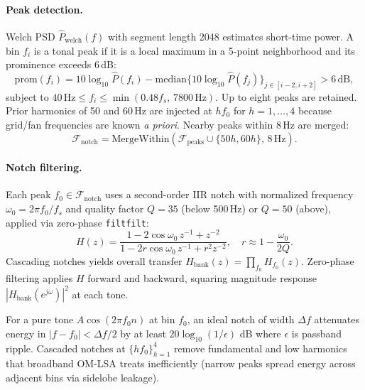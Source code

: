\paragraph{Peak detection.}
Welch PSD $\hat{P}_{\mathrm{welch}}(f)$ with segment length 2048 estimates short-time power. A bin $f_i$ is a tonal peak if it is a local maximum in a 5-point neighborhood and its prominence exceeds 6\,dB:
\begin{equation}
  \mathrm{prom}(f_i) = 10\log_{10}\hat{P}(f_i) - \mathrm{median}\bigl\{10\log_{10}\hat{P}(f_j)\bigr\}_{j\in[i-2,i+2]} > 6\,\mathrm{dB},
  \label{eq:peak_prom}
\end{equation}
subject to $40\,\mathrm{Hz} \le f_i \le \min(0.48 f_s,\, 7800\,\mathrm{Hz})$. Up to eight peaks are retained. Prior harmonics of 50 and 60\,Hz are injected at $hf_0$ for $h=1,\ldots,4$ because grid/fan frequencies are known \emph{a priori}. Nearby peaks within 8\,Hz are merged:
\begin{equation}
  \mathcal{F}_{\mathrm{notch}} = \mathrm{MergeWithin}(\mathcal{F}_{\mathrm{peaks}} \cup \{50h, 60h\},\, 8\,\mathrm{Hz}).
\end{equation}

\paragraph{Notch filtering.}
Each peak $f_0\in\mathcal{F}_{\mathrm{notch}}$ uses a second-order IIR notch with normalized frequency $\omega_0 = 2\pi f_0/f_s$ and quality factor $Q=35$ (below 500\,Hz) or $Q=50$ (above), applied via zero-phase \texttt{filtfilt}:
\begin{equation}
  H(z) = \frac{1 - 2\cos\omega_0\, z^{-1} + z^{-2}}{1 - 2r\cos\omega_0\, z^{-1} + r^2 z^{-2}}, \quad r \approx 1 - \frac{\omega_0}{2Q}.
  \label{eq:notch_tf}
\end{equation}
Cascading notches yields overall transfer $H_{\mathrm{bank}}(z)=\prod_{f_0} H_{f_0}(z)$. Zero-phase filtering applies $H$ forward and backward, squaring magnitude response $|H_{\mathrm{bank}}(e^{j\omega})|^2$ at each tone.

\begin{proposition}
\label{prop:notch}
For a pure tone $A\cos(2\pi f_0 n)$ at bin $f_0$, an ideal notch of width $\Delta f$ attenuates energy in $|f-f_0|<\Delta f/2$ by at least $20\log_{10}(1/\epsilon)$ dB where $\epsilon$ is passband ripple. Cascaded notches at $\{hf_0\}_{h=1}^4$ remove fundamental and low harmonics that broadband OM-LSA treats inefficiently (narrow peaks spread energy across adjacent bins via sidelobe leakage).
\end{proposition}

